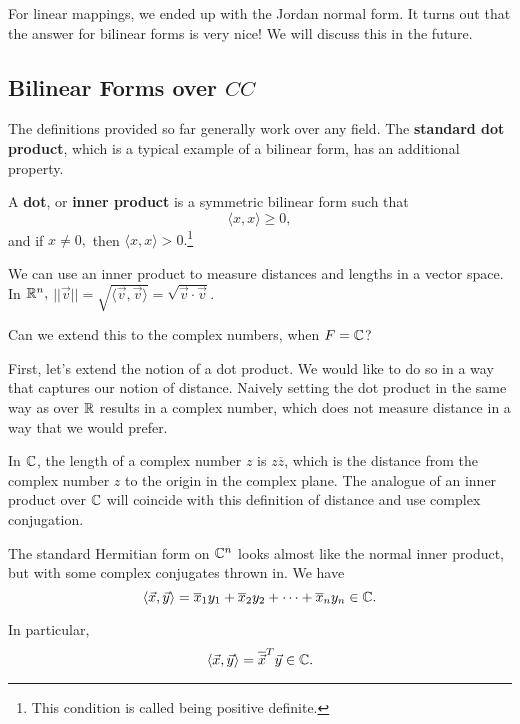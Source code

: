 For linear mappings, we ended up with the Jordan normal form. It turns out that the answer for bilinear forms is very nice! We will discuss this in the future. 

\subsection{Bilinear Forms over \texorpdfstring{$CC$}{C}}
The definitions provided so far generally work over any field. The \textbf{standard dot product}, which is a typical example of a bilinear form, has an additional property.

\begin{definition}
A \textbf{dot}, or \textbf{inner product} is a symmetric bilinear form such that 
\[
\langle x, x \rangle \geq 0,\] and if $x \neq 0,$ then $\langle x, x \rangle > 0.$\footnote{This condition is called being positive definite.}

\end{definition}

We can use an inner product to measure distances and lengths in a vector space. In $\mathbb R^n,$ $||\vec{v}|| = \sqrt{\langle \vec{v}, \vec{v} \rangle} = \sqrt{\vec{v} \cdot \vec{v}}.$

\begin{qq}
Can we extend this to the complex numbers, when $F = \mathbb C$?
\end{qq}

First, let's extend the notion of a dot product. We would like to do so in a way that captures our notion of distance. Naively setting the dot product in the same way as over $\mathbb R$ results in a complex number, which does not measure distance in a way that we would prefer. 

In $\mathbb C$, the length of a complex number $z$ is $z\overline{z}$, which is the distance from the complex number $z$ to the origin in the complex plane. The analogue of an inner product over $\mathbb C$ will coincide with this definition of distance and use complex conjugation.

\begin{definition}
The standard Hermitian form on $\mathbb C^n$ looks almost like the normal inner product, but with some complex conjugates thrown in. We have 
\[
\langle \vec{x}, \vec{y} \rangle = \overline{x}_1y_1 + \overline{x}_2y_2 + \cdots + \overline{x}_ny_n \in \mathbb C.
\]

In particular, \[\langle \vec{x}, \vec{y} \rangle = \overline{\vec{x}}^T\vec{y} \in \mathbb C.\]
\end{definition}

